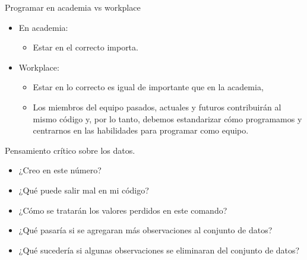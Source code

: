 \documentclass[11pt, aspectratio=169, compress]{beamer}
\begin{document}
\begin{frame}{Programar en academia vs workplace}
	\begin{itemize}
		\item En academia: 
		\begin{itemize}
			\item Estar en el correcto importa. 
		\end{itemize}
		\item Workplace:
		\begin{itemize}
			\item Estar en lo correcto es igual de importante que en la academia,
			\item Los miembros del equipo pasados, actuales y futuros contribuirán al mismo código y, por lo tanto, debemos estandarizar cómo programamos y centrarnos en las habilidades para programar como equipo.
		\end{itemize}
	\end{itemize}	
\end{frame}
\begin{frame}{Pensamiento crítico sobre los datos.}
	\begin{itemize}
		\item ¿Creo en este número?
		\item ¿Qué puede salir mal en mi código?
		\item ¿Cómo se tratarán los valores perdidos en este comando?
		\item ¿Qué pasaría si se agregaran más observaciones al conjunto de datos?
		\item ¿Qué sucedería si algunas observaciones se eliminaran del conjunto de datos?
	\end{itemize}
\end{frame}
\end{document}
